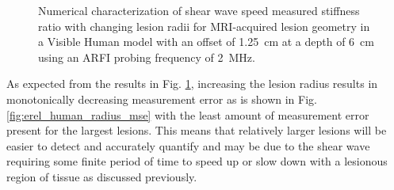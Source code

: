 			\begin{figure}[!htb]
				\centering
				\caption[Numerical characterization of shear wave speed measured stiffness ratio with changing lesion radii in a visible human model]{Numerical characterization of shear wave speed measured stiffness ratio with changing lesion radii for MRI-acquired lesion geometry in a Visible Human model with an offset of \SI{1.25}{\cm} at a depth of \SI{6}{\cm} using an ARFI probing frequency of \SI{2}{\MHz}.}
				\label{fig:erel_human_radius}
			\end{figure}

			As expected from the results in Fig. \ref{fig:erel_human_radius}, increasing the lesion radius results in monotonically decreasing measurement error as is shown in Fig. \ref{fig:erel_human_radius_mse} with the least amount of measurement error present for the largest lesions. This means that relatively larger lesions will be easier to detect and accurately quantify and may be due to the shear wave requiring some finite period of time to speed up or slow down with a lesionous region of tissue as discussed previously.

